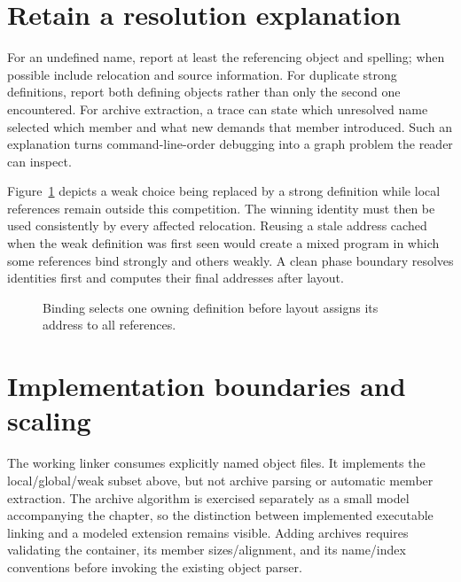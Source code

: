 \section{Retain a resolution explanation}
\label{sec:ch57-diagnostics}

For an undefined name, report at least the referencing object and spelling; when possible include relocation and source information.
For duplicate strong definitions, report both defining objects rather than only the second one encountered.
For archive extraction, a trace can state which unresolved name selected which member and what new demands that member introduced.
Such an explanation turns command-line-order debugging into a graph problem the reader can inspect.

Figure~\ref{fig:ch57-resolution} depicts a weak choice being replaced by a strong definition while local references remain outside this competition.
The winning identity must then be used consistently by every affected relocation.
Reusing a stale address cached when the weak definition was first seen would create a mixed program in which some references bind strongly and others weakly.
A clean phase boundary resolves identities first and computes their final addresses after layout.

\begin{figure}[htbp]
\centering
{}
\caption{Binding selects one owning definition before layout assigns its address to all references.}
\label{fig:ch57-resolution}
\end{figure}

\section{Implementation boundaries and scaling}
\label{sec:ch57-implementation}

The working linker consumes explicitly named object files.
It implements the local/global/weak subset above, but not archive parsing or automatic member extraction.
The archive algorithm is exercised separately as a small model accompanying the chapter, so the distinction between implemented executable linking and a modeled extension remains visible.
Adding archives requires validating the container, its member sizes/alignment, and its name/index conventions before invoking the existing object parser.


